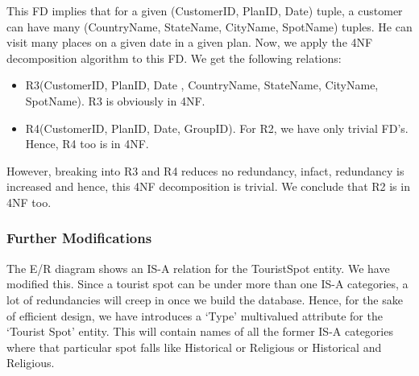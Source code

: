 \documentclass[11pt]{article}
\begin{document}
\begin{itemize}
This FD implies that for a given (CustomerID, PlanID, Date) tuple, a customer can have many (CountryName, StateName, CityName, SpotName) tuples. He can visit many places on a given date in a given plan. Now, we apply the 4NF decomposition algorithm to this FD. We get the following relations:
\begin{itemize}
\item R3(CustomerID, PlanID, Date , CountryName, StateName, CityName, SpotName). R3 is obviously in 4NF.
\item R4(CustomerID, PlanID, Date, GroupID). For R2, we have only trivial FD’s. Hence, R4 too is in 4NF.
\end{itemize}
However, breaking into R3 and R4 reduces no redundancy, infact, redundancy is increased and hence, this 4NF decomposition is trivial. We conclude that R2 is in 4NF too. \newline
\end{itemize}

\subsubsection*{Further Modifications}
The E/R diagram shows an IS-A relation for the TouristSpot entity. We have modified this. Since a tourist spot can be under more than one IS-A categories, a lot of redundancies will creep in once we build the database. Hence, for the sake of efficient design, we have introduces a ‘Type’ multivalued attribute for the ‘Tourist Spot’ entity. This will contain names of all the former IS-A categories where that particular spot falls like Historical or Religious or Historical and Religious.
\end{document}
